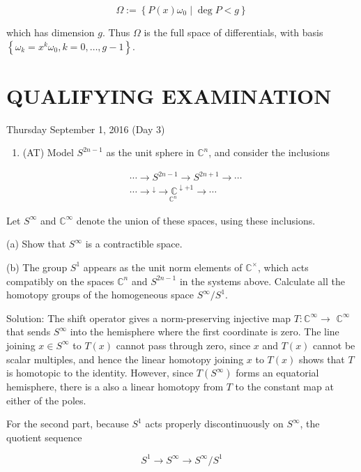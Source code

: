 \documentclass[10pt]{article}
\begin{document}
$$
\Omega:=\left\{P(x) \omega_{0} \mid \operatorname{deg} P<g\right\}
$$

which has dimension $g$. Thus $\Omega$ is the full space of differentials, with basis $\left\{\omega_{k}=x^{k} \omega_{0}, k=0, \ldots, g-1\right\}$.

\section*{QUALIFYING EXAMINATION }
Thursday September 1, 2016 (Day 3)

\begin{enumerate}
  \item (AT) Model $S^{2 n-1}$ as the unit sphere in $\mathbb{C}^{n}$, and consider the inclusions
\end{enumerate}

$$
\begin{aligned}
& \cdots \rightarrow S^{2 n-1} \rightarrow S^{2 n+1} \rightarrow \cdots \\
& \cdots \rightarrow \underset{\mathbb{C}^{n}}{\stackrel{\downarrow}{ } \rightarrow \mathbb{C}^{\downarrow+1}} \rightarrow \cdots
\end{aligned}
$$

Let $S^{\infty}$ and $\mathbb{C}^{\infty}$ denote the union of these spaces, using these inclusions.

(a) Show that $S^{\infty}$ is a contractible space.

(b) The group $S^{1}$ appears as the unit norm elements of $\mathbb{C}^{\times}$, which acts compatibly on the spaces $\mathbb{C}^{n}$ and $S^{2 n-1}$ in the systems above. Calculate all the homotopy groups of the homogeneous space $S^{\infty} / S^{1}$.

Solution: The shift operator gives a norm-preserving injective map $T: \mathbb{C}^{\infty} \rightarrow$ $\mathbb{C}^{\infty}$ that sends $S^{\infty}$ into the hemisphere where the first coordinate is zero. The line joining $x \in S^{\infty}$ to $T(x)$ cannot pass through zero, since $x$ and $T(x)$ cannot be scalar multiples, and hence the linear homotopy joining $x$ to $T(x)$ shows that $T$ is homotopic to the identity. However, since $T\left(S^{\infty}\right)$ forms an equatorial hemisphere, there is a also a linear homotopy from $T$ to the constant map at either of the poles.

For the second part, because $S^{1}$ acts properly discontinuously on $S^{\infty}$, the quotient sequence

$$
S^{1} \rightarrow S^{\infty} \rightarrow S^{\infty} / S^{1}
$$
\end{document}
